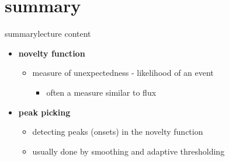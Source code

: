     \section{summary}
        \begin{frame}{summary}{lecture content}
            \begin{itemize}
                \item   \textbf{novelty function}
                    \begin{itemize}
                        \item   measure of unexpectedness - likelihood of an event
                            \begin{itemize}
                                \item   often a measure similar to flux
                            \end{itemize}
                    \end{itemize}
                \bigskip
                \item   \textbf{peak picking}
                    \begin{itemize}
                        \item   detecting peaks (onsets) in the novelty function
                        \item   usually done by smoothing and adaptive thresholding
                    \end{itemize}
            \end{itemize}
        \end{frame}

